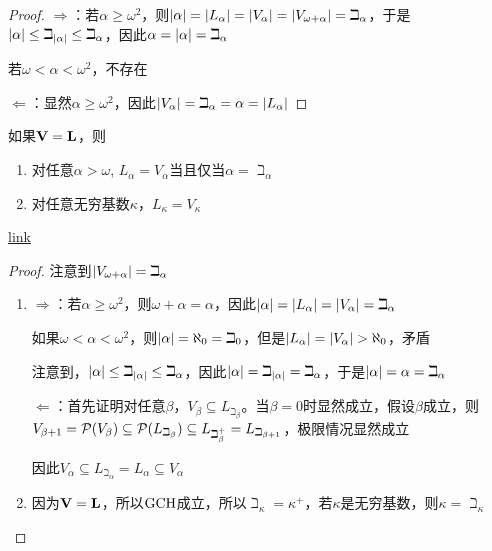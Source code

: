 \documentclass[11pt]{article}
\begin{document}
\begin{proof}
\(\Rightarrow\)：若\(\alpha\ge\omega^2\)，则\(\abs{\alpha}=\abs{L_\alpha}=\abs{V_\alpha}=\abs{V_{\omega+\alpha}}=\beth_\alpha\)，于是
\(\abs{\alpha}\le\beth_{\abs{\alpha}}\le\beth_\alpha\)，因此\(\alpha=\abs{\alpha}=\beth_\alpha\)

若\(\omega<\alpha<\omega^2\)，不存在

\(\Leftarrow\)：显然\(\alpha\ge\omega^2\)，因此\(\abs{V_\alpha}=\beth_\alpha=\alpha=\abs{L_\alpha}\)
\end{proof}

\begin{exercise}[8.4.6]
如果\(\operatorname{\textbf{V}}=\operatorname{\textbf{L}}\)，则
\begin{enumerate}
\item 对任意\(\alpha>\omega\), \(L_\alpha=V_\alpha\)当且仅当\(\alpha=\beth_\alpha\)
\item 对任意无穷基数\(\kappa\)，\(L_\kappa=V_\kappa\)
\end{enumerate}
\end{exercise}

\href{https://math.stackexchange.com/questions/2668315/assuming-zf-and-the-axiom-of-constructibility-alpha-omega-v-alpha-l-a}{link}

\begin{proof}
注意到\(\abs{V_{\omega+\alpha}}=\beth_\alpha\)
\begin{enumerate}
\item \(\Rightarrow\)：若\(\alpha\ge\omega^2\)，则\(\omega+\alpha=\alpha\)，因此\(\abs{\alpha}=\abs{L_\alpha}=\abs{V_\alpha}=\beth_\alpha\)

如果\(\omega<\alpha<\omega^2\)，则\(\abs{\alpha}=\aleph_0=\beth_0\)，但是\(\abs{L_\alpha}=\abs{V_\alpha}>\aleph_0\)，矛盾

注意到，\(\abs{\alpha}\le\beth_{\abs{\alpha}}\le\beth_\alpha\)，因此\(\abs{\alpha}=\beth_{\abs{\alpha}}=\beth_{\alpha}\)，于是\(\abs{\alpha}=\alpha=\beth_\alpha\)

\(\Leftarrow\)：首先证明对任意\(\beta\)，\(V_\beta\subseteq L_{\beth_\beta}\)。当\(\beta=0\)时显然成立，假设\(\beta\)成立，则
\(V_{\beta+1}=\mathcal{P}(V_\beta)\subseteq\mathcal{P}(L_{\beth_\beta})\subseteq L_{\beth_\beta^+}=L_{\beth_{\beta+1}}\)，极限情况显然成立

因此\(V_\alpha\subseteq L_{\beth_\alpha}=L_\alpha\subseteq V_\alpha\)

\item 因为\(\operatorname{\textbf{V}}=\operatorname{\textbf{L}}\)，所以\(\operatorname{GCH}\)成立，所以\(\beth_\kappa=\kappa^+\)，若\(\kappa\)是无穷基数，则\(\kappa=\beth_\kappa\)
\end{enumerate}
\end{proof}
\end{document}
